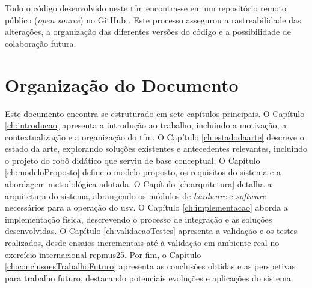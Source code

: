 Todo o código desenvolvido neste \gls{tfm} encontra-se em um repositório remoto público (\emph{open source}) no GitHub \cite{github-usv}. Este processo assegurou a rastreabilidade das alterações, a organização das diferentes versões do código e a possibilidade de colaboração futura.

\section{Organização do Documento}
\label{sec:organizacao}

Este documento encontra-se estruturado em sete capítulos principais. O Capítulo \ref{ch:introducao} apresenta a introdução ao trabalho, incluindo a motivação, a contextualização e a organização do \gls{tfm}. O Capítulo \ref{ch:estadodaarte} descreve o estado da arte, explorando soluções existentes e antecedentes relevantes, incluindo o projeto do robô didático que serviu de base conceptual. O Capítulo \ref{ch:modeloProposto} define o modelo proposto, os requisitos do sistema e a abordagem metodológica adotada. O Capítulo \ref{ch:arquitetura} detalha a arquitetura do sistema, abrangendo os módulos de \emph{hardware} e \emph{software} necessários para a operação do \gls{usv}. O Capítulo \ref{ch:implementacao} aborda a implementação física, descrevendo o processo de integração e as soluções desenvolvidas. O Capítulo \ref{ch:validacaoTestes} apresenta a validação e os testes realizados, desde ensaios incrementais até à validação em ambiente real no exercício internacional \gls{repmus25}. Por fim, o Capítulo \ref{ch:conclusoesTrabalhoFuturo} apresenta as conclusões obtidas e as perspetivas para trabalho futuro, destacando potenciais evoluções e aplicações do sistema.
